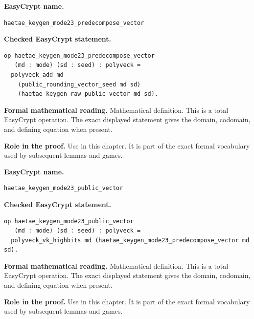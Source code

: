 \begin{formaldefinition}
\noindent\textbf{EasyCrypt name.}
\begin{lstlisting}[language=EasyCrypt,basicstyle=\ttfamily\scriptsize]
haetae_keygen_mode23_predecompose_vector
\end{lstlisting}
\noindent\textbf{Checked EasyCrypt statement.}
\begin{lstlisting}[language=EasyCrypt,basicstyle=\ttfamily\scriptsize]
op haetae_keygen_mode23_predecompose_vector
   (md : mode) (sd : seed) : polyveck =
  polyveck_add md
    (public_rounding_vector_seed md sd)
    (haetae_keygen_raw_public_vector md sd).
\end{lstlisting}
\noindent\textbf{Formal mathematical reading.}
Mathematical definition. This is a total EasyCrypt operation.  The exact displayed statement gives the domain, codomain, and defining equation when present.

\noindent\textbf{Role in the proof.}
Use in this chapter. It is part of the exact formal vocabulary used by subsequent lemmas and games.

\end{formaldefinition}

\begin{formaldefinition}
\noindent\textbf{EasyCrypt name.}
\begin{lstlisting}[language=EasyCrypt,basicstyle=\ttfamily\scriptsize]
haetae_keygen_mode23_public_vector
\end{lstlisting}
\noindent\textbf{Checked EasyCrypt statement.}
\begin{lstlisting}[language=EasyCrypt,basicstyle=\ttfamily\scriptsize]
op haetae_keygen_mode23_public_vector
   (md : mode) (sd : seed) : polyveck =
  polyveck_vk_highbits md (haetae_keygen_mode23_predecompose_vector md sd).
\end{lstlisting}
\noindent\textbf{Formal mathematical reading.}
Mathematical definition. This is a total EasyCrypt operation.  The exact displayed statement gives the domain, codomain, and defining equation when present.

\noindent\textbf{Role in the proof.}
Use in this chapter. It is part of the exact formal vocabulary used by subsequent lemmas and games.

\end{formaldefinition}

